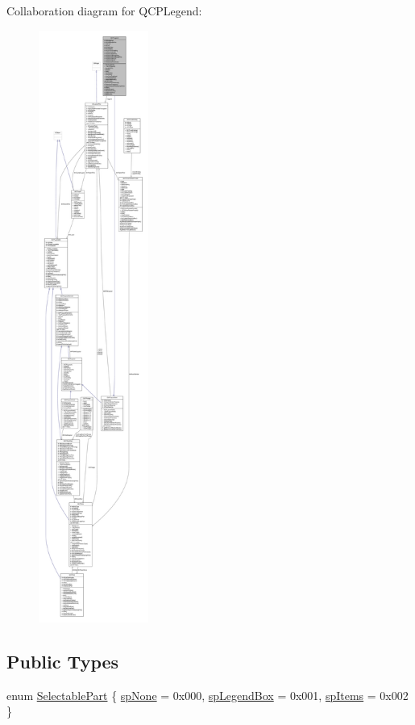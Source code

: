 Collaboration diagram for Q\+C\+P\+Legend\+:\nopagebreak
\begin{figure}[H]
\begin{center}
\leavevmode
\includegraphics[height=550pt]{class_q_c_p_legend__coll__graph}
\end{center}
\end{figure}
\subsection*{Public Types}
\begin{DoxyCompactItemize}
\item 
enum \hyperlink{class_q_c_p_legend_a5404de8bc1e4a994ca4ae69e2c7072f1}{Selectable\+Part} \{ \hyperlink{class_q_c_p_legend_a5404de8bc1e4a994ca4ae69e2c7072f1a378201c07d500af7126e3ec91652eed7}{sp\+None} = 0x000, 
\hyperlink{class_q_c_p_legend_a5404de8bc1e4a994ca4ae69e2c7072f1a0fa4758962a46fa1dc9da818abae23c4}{sp\+Legend\+Box} = 0x001, 
\hyperlink{class_q_c_p_legend_a5404de8bc1e4a994ca4ae69e2c7072f1a768bfb95f323db4c66473375032c0af7}{sp\+Items} = 0x002
 \}
\end{DoxyCompactItemize}

